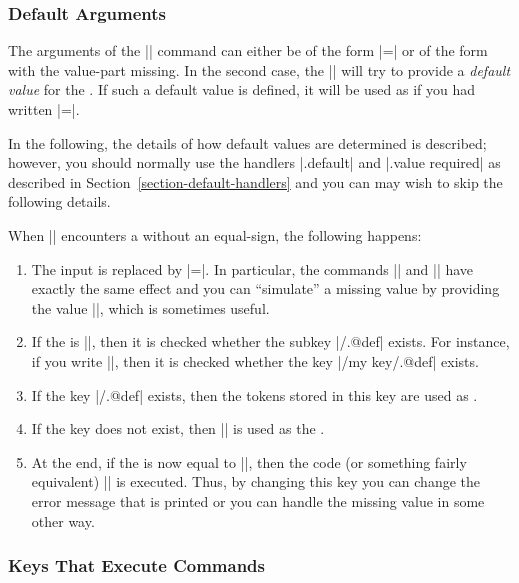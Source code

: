 \subsubsection{Default Arguments}

The arguments of the |\pgfkeys| command can either be of the form
|=| or of the form  with the
value-part missing. In the second case, the |\pgfkeys| will try to
provide a \emph{default value} for the . If such a default
value is defined, it will be used as if you had written
|=|.

In the following, the details of how default values are determined is
described; however, you should normally use the handlers |.default|
and |.value required| as described in
Section~\ref{section-default-handlers} and you can may wish to skip
the following details.

When |\pgfkeys| encounters a  without an equal-sign, the
following happens:
\begin{enumerate}
\item The input is replaced by |=\pgfkeysnovalue|. In
  particular, the commands || and
  || have exactly the same effect and
  you can ``simulate'' a missing value by providing the value
  |\pgfkeysnovalue|, which is sometimes useful. 
\item If the  is |\pgfkeysnovalue|, then it is checked
  whether the subkey |/.@def| exists. For instance, if you
  write ||, then it is checked whether the key
  |/my key/.@def| exists.
\item If the key |/.@def| exists, then the tokens stored in
  this key are used as .
\item If the key does not exist, then |\pgfkeysnovalue| is used as the
  .
\item At the end, if the  is now equal to
  |\pgfkeysvaluerequired|, then the code  (or something fairly equivalent)
  ||
  is executed. Thus, by changing this key you can change the error
  message that is printed or you can handle the missing value in some
  other way.
\end{enumerate}



\subsubsection{Keys That Execute Commands}
\label{section-key-code}

